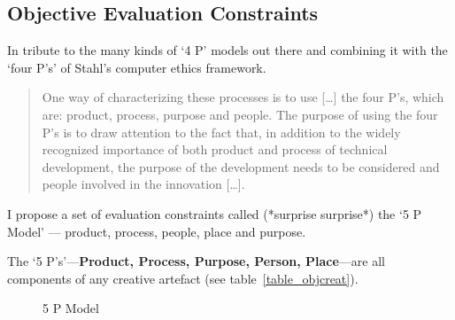 \subsection{Objective Evaluation Constraints}
\label{s:oec}

In tribute to the many kinds of `4 P' models out there and combining it with the `four P\rq s' of Stahl's computer ethics framework.

\begin{quote}
  One way of characterizing these processes is to use [\ldots] the four P's, which are: product, process, purpose and people. The purpose of using the four P's is to draw attention to the fact that, in addition to the widely recognized importance of both product and process of technical development, the purpose of the development needs to be considered and people involved in the innovation [\ldots]. 
\end{quote}

I propose a set of evaluation constraints called (*surprise surprise*) the `5 P Model' --- product, process, people, place and purpose.



The `5 P\rq s'---\textbf{Product, Process, Purpose, Person, Place}---are all components of any creative artefact (see table~\ref{table_objcreat}).

\begin{figure}[!htbp] %
  \centering
  \tikzset{every fit/.append style=text badly centered}
\caption[5 P Model]{5 P Model}
\label{fig:5PModel}
\end{figure}

